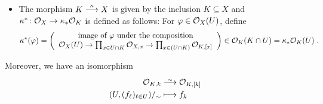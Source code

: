 \documentclass[a4paper,parskip=half,numbers=enddot, DIV=12]{scrreprt}
\begin{document}
\begin{prop}
\begin{itemize}
        \item The morphism $K\morphism[\kappa] X$ is given by the inclusion $K\subseteq X$ and $\kappa^*\colon \Oo_X\morphism\kappa_*\Oo_K$ is defined as follows: For $\varphi\in\mathcal{O}_X(U)$, define
       \begin{align*}
       	\kappa^*(\phi)=\left(
       	\begin{array}{c}
	       	\text{image of }\phi\text{ under the composition}\\
	       	\Oo_X(U) \morphism \prod_{x\in U\cap K} \Oo_{X,x} \morphism \prod_{x\in (U\cap K)} \Oo_{K,[x]}
       	\end{array}\right)\in\Oo_K(K\cap U)=\kappa_*\Oo_K(U)\;.
       \end{align*} 
    \end{itemize}
    Moreover, we have an isomorphism
    \begin{align*}
    \Oo_{K,k} &\isomorphism \Oo_{K,[k]}\\
    (U,(f_\ell)_{\ell\in U})/_\sim &\longmapsto f_k
    \end{align*}
\end{prop}
\end{document}
